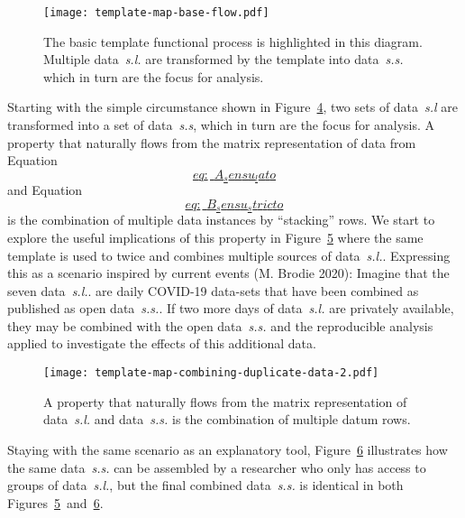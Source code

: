 \documentclass[
]{article}
\begin{document}
\begin{figure}
\hypertarget{fig:template-map-base-flow}{%
\centering
\texttt{[image: template-map-base-flow.pdf]}
\caption{The basic template functional process is highlighted in this
diagram. Multiple data~\emph{s.l.} are transformed by the template into
data~\emph{s.s.} which in turn are the focus for
analysis.}\label{fig:template-map-base-flow}
}
\end{figure}

Starting with the simple circumstance shown in
Figure~\protect\hyperlink{fig:template-map-base-flow}{4}, two sets of
data~\emph{s.l} are transformed into a set of data~\emph{s.s}, which in
turn are the focus for analysis. A property that naturally flows from
the matrix representation of data from
Equation~\protect\hyperlink{eq:_A_sensu_lato}{\[eq:\_A_sensu_lato\]} and
Equation~\protect\hyperlink{eq:_B_sensu_stricto}{\[eq:\_B_sensu_stricto\]}
is the combination of multiple data instances by ``stacking'' rows. We
start to explore the useful implications of this property in
Figure~\protect\hyperlink{fig:template-map-combining-duplicate-data-2}{5}
where the same template is used to twice and combines multiple sources
of data~\emph{s.l.}. Expressing this as a scenario inspired by current
events (M. Brodie 2020): Imagine that the seven data~\emph{s.l.}. are
daily COVID-19 data-sets that have been combined as published as open
data~\emph{s.s.}. If two more days of data~\emph{s.l.} are privately
available, they may be combined with the open data~\emph{s.s.} and the
reproducible analysis applied to investigate the effects of this
additional data.

\begin{figure}
\hypertarget{fig:template-map-combining-duplicate-data-2}{%
\centering
\texttt{[image: template-map-combining-duplicate-data-2.pdf]}
\caption{A property that naturally flows from the matrix representation
of data~\emph{s.l.} and data~\emph{s.s.} is the combination of multiple
datum rows.}\label{fig:template-map-combining-duplicate-data-2}
}
\end{figure}

Staying with the same scenario as an explanatory tool,
Figure~\protect\hyperlink{fig:template-map-combining-duplicate-data-1}{6}
illustrates how the same data~\emph{s.s.} can be assembled by a
researcher who only has access to groups of data~\emph{s.l.}, but the
final combined data~\emph{s.s.} is identical in both
Figures~\protect\hyperlink{fig:template-map-combining-duplicate-data-2}{5}~and~\protect\hyperlink{fig:template-map-combining-duplicate-data-1}{6}.
\end{document}
